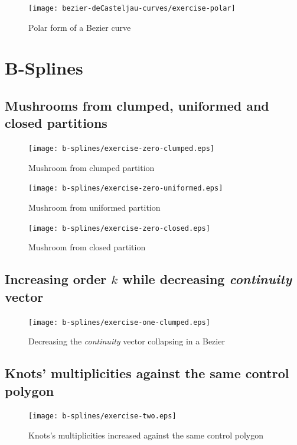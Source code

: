 \documentclass{article}
\begin{document}
\begin{figure}[h!]
  \centering
  \texttt{[image: bezier-deCasteljau-curves/exercise-polar]}
  \caption{Polar form of a Bezier curve}
  \label{fig:exercise-polar-form}
\end{figure}


\section{B-Splines}

\subsection{Mushrooms from clumped, uniformed and closed partitions}
\begin{figure}[h!]
  \centering
  \texttt{[image: b-splines/exercise-zero-clumped.eps]}
  \caption{Mushroom from clumped partition}
  \label{fig:clumpled-mushroom}
\end{figure}

\begin{figure}[h!]
  \centering
  \texttt{[image: b-splines/exercise-zero-uniformed.eps]}
  \caption{Mushroom from uniformed partition}
  \label{fig:uniformed-mushroom}
\end{figure}

\begin{figure}[h!]
  \centering
  \texttt{[image: b-splines/exercise-zero-closed.eps]}
  \caption{Mushroom from closed partition}
  \label{fig:closed-mushroom}
\end{figure}

\subsection{Increasing order $k$ while decreasing \emph{continuity} vector }
\begin{figure}[h!]
  \centering
  \texttt{[image: b-splines/exercise-one-clumped.eps]}
  \caption{Decreasing the \emph{continuity} vector collapsing in a Bezier }
  \label{fig:bspline-exercise-one-clumped}
\end{figure}

\subsection{Knots' multiplicities against the same control polygon}
\begin{figure}[h!]
  \centering
  \texttt{[image: b-splines/exercise-two.eps]}
  \caption{Knots's multiplicities increased against the same control polygon }
  \label{fig:bspline-exercise-two}
\end{figure}
\end{document}
